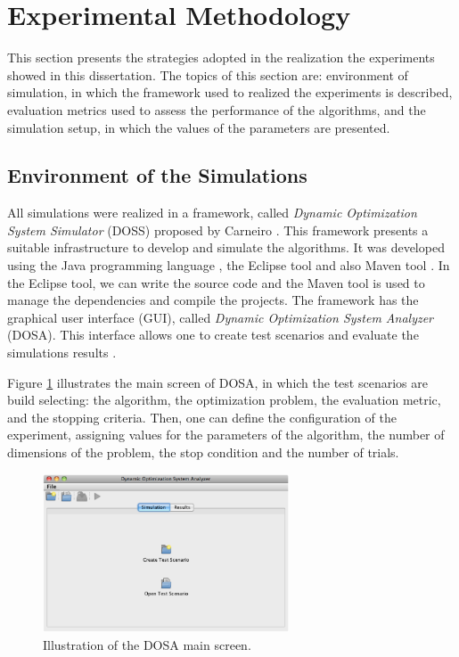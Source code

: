 \section{Experimental Methodology}
This section presents the strategies adopted in the realization the experiments showed in this dissertation. The topics of this section are: environment of simulation, in which the framework used to realized the experiments is described, evaluation metrics used to assess the performance of the algorithms, and the simulation setup, in which the values of the parameters are presented.

\subsection{Environment of the Simulations}
All simulations were realized in a framework, called \emph{Dynamic Optimization System Simulator} (DOSS) proposed by Carneiro \cite{DOSS:Castro2010}. This framework presents a suitable infrastructure to develop and simulate the algorithms. It was developed using the Java programming language \cite{DOSS:Java2005}, the Eclipse tool \cite{DOSS:Eclipse2011} and also Maven tool \cite{DOSS:Maven2011}. In the Eclipse tool, we can write the source code and the Maven tool is used to manage the dependencies and compile the projects. The framework has the graphical user interface (GUI), called \emph{Dynamic Optimization System Analyzer} (DOSA). This interface allows one to create test scenarios and evaluate the simulations results \cite{DOSS:Castro2010}.

Figure \ref{fig:DOSA-DOSS} illustrates the main screen of DOSA, in which the test scenarios are build selecting: the algorithm, the optimization problem, the evaluation metric, and the stopping criteria. Then, one can define the configuration of the experiment, assigning values for the parameters of the algorithm, the number of dimensions of the problem, the stop condition and the number of trials.

\begin{figure}[!h]
\centering
 \includegraphics[width=0.65\textwidth]{image/DOSA-DOSS.png}
 \caption{\small{Illustration of the DOSA main screen.}}
 \label{fig:DOSA-DOSS}
\end{figure}

